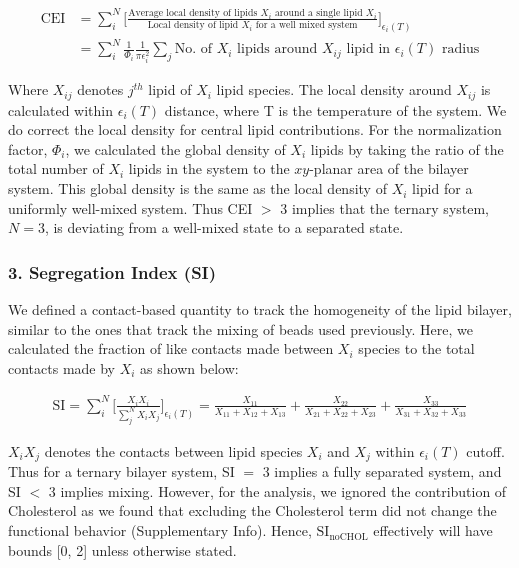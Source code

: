\documentclass{biophys-new}
\begin{document}
\begin{equation}
    \begin{aligned}
    \label{eq:CLT}
    \text{CEI} {}   & = \sum_{i}^{N}\Bigg[\frac{\text{Average local density of lipids $X_i$ around a single lipid $X_i$}}{\text{Local density of lipid $X_i$ for a well mixed system}}\Bigg]_{\text{$\epsilon_i(T)$}} \\
                    & =  \sum_{i}^{N} \frac{1}{\Phi_i}\frac{1}{\text{$\pi\epsilon_i^2$}}\sum_{j}\text{No. of $X_i$ lipids around $X_{ij}$ lipid in $\epsilon_i(T)$ radius}
    \end{aligned}
\end{equation}

Where $X_{ij}$ denotes $j^{th}$ lipid of $X_i$ lipid species.
The local density around $X_{ij}$ is calculated within $\epsilon_i(T)$ distance, where T is the temperature of the system.
We do correct the local density for central lipid contributions.
For the normalization factor, $\Phi_i$,  we calculated the global density of $X_i$ lipids by taking the ratio of the total number of $X_i$ lipids in the system to the $xy$-planar area of the bilayer system.
This global density is the same as the local density of $X_{i}$ lipid for a uniformly well-mixed system.
Thus CEI $>$ 3 implies that the ternary system, $N=3$, is deviating from a well-mixed state to a separated state.

\subsubsection*{3. Segregation Index (SI)}

We defined a contact-based quantity to track the homogeneity of the lipid bilayer, similar to the ones that track the mixing of beads used previously\cite{Marigo2012, Kumar2020}.
Here, we calculated the fraction of like contacts made between $X_i$ species to the total contacts made by $X_i$ as shown below:

\begin{equation}
    \begin{aligned}
    \label{eq:CLT}
    \text{SI} = \sum_{i}^{N}\Bigg[\frac{X_iX_i}{\sum_{j}^{N}X_iX_j}\Bigg]_{\text{$\epsilon_i(T)$}} = \frac{X_{11}}{X_{11} + X_{12} + X_{13}} + \frac{X_{22}}{X_{21} + X_{22} + X_{23}} + \frac{X_{33}}{X_{31} + X_{32} + X_{33}}
    \end{aligned}
\end{equation}

$X_iX_j$ denotes the contacts between lipid species $X_i$ and $X_j$ within $\epsilon_i(T)$ cutoff.
Thus for a ternary bilayer system, SI $=$ 3 implies a fully separated system, and SI $<$ 3 implies mixing.
However, for the analysis, we ignored the contribution of Cholesterol as we found that excluding the Cholesterol term did not change the functional behavior (Supplementary Info).
Hence, $\text{SI}_{\text{noCHOL}}$ effectively will have bounds [0, 2] unless otherwise stated.    
\end{document}
